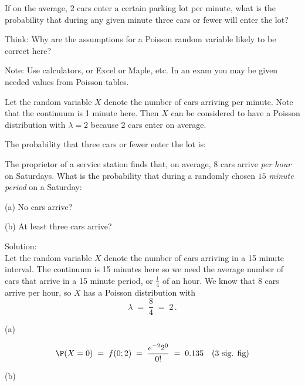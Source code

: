 \begin{example}{\label{eqn:poi_cars}}
If on the average, 2 cars enter a certain parking lot per minute,
  what is the probability that during any given minute three cars or
  fewer
  will enter the lot?

Think: Why are the assumptions for a Poisson random variable likely to
be correct here?

Note: Use calculators, or Excel or Maple, etc. In an exam you may be given needed values from Poisson tables.


Let the random variable $X$ denote the number of cars
  arriving per minute. Note that the continuum is 1 minute here. Then  $X$ can be considered to have  a Poisson distribution
  with $\lambda=2$ because 2 cars enter on
average.

\medskip

The probability that three cars or fewer enter the lot is:
\end{example}


\begin{example}\label{Eg:serviceStation}
The proprietor of a service station finds that, on average, $8$
  cars arrive \emph{per hour} on Saturdays. What is the probability
  that during a randomly chosen $15$ \emph{minute period} on a Saturday:
\be
\item[(a)] No cars arrive?
\item[(b)]  At least three cars arrive?
\ee

Solution:\\[4pt]
Let the random variable $X$ denote the number of cars
  arriving in a 15 minute interval. The continuum is 15 minutes here so
  we need the average number of cars that arrive in a 15 minute
  period, or $\frac{1}{4}$ of an hour.  We know that 8 cars arrive per
  hour, so  $X$ has a Poisson distribution
  with
\[\lambda \;=\; \frac{8}{4}\;=\; 2\,.\]

\be
\item[(a)]

\[\P(X=0)\;=\;  f(0; 2)\;=\;  \frac{ e^{-2} 2^0}{0!}\;=\; 0.135 \quad (\text{3 sig. fig})\]

\item[(b)]
\ee
\end{example}

